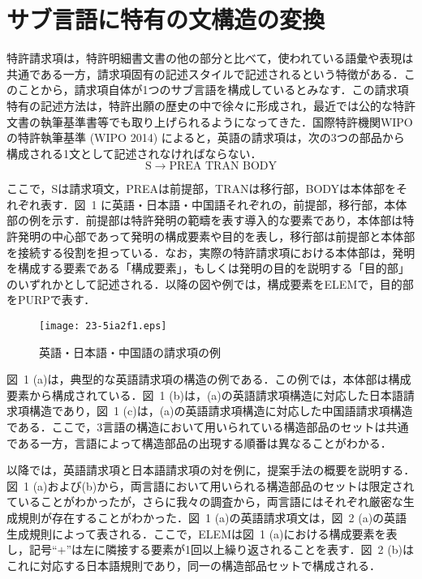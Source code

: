 \documentclass[japanese]{jnlp_1.4}
\begin{document}
\section{サブ言語に特有の文構造の変換}

特許請求項は，特許明細書文書の他の部分と比べて，使われている語彙や表現は共通である一方，請求項固有の記述スタイルで記述されるという特徴がある．このことから，請求項自体が1つのサブ言語を構成しているとみなす．この請求項特有の記述方法は，特許出願の歴史の中で徐々に形成され，最近では公的な特許文書の執筆基準書等でも取り上げられるようになってきた．国際特許機関WIPOの特許執筆基準 (WIPO 
2014) によると，英語の請求項は，次の3つの部品から構成される1文として記述されなければならない．
\[
\mathrm{S} \rightarrow \text{PREA\ TRAN\ BODY}
\]

ここで，Sは請求項文，PREAは前提部，TRANは移行部，BODYは本体部をそれぞれ表す．図~1 に英語・日本語・中国語それぞれの，前提部，移行部，本体部の例を示す．前提部は特許発明の範疇を表す導入的な要素であり，本体部は特許発明の中心部であって発明の構成要素や目的を表し，移行部は前提部と本体部を接続する役割を担っている．なお，実際の特許請求項における本体部は，発明を構成する要素である「構成要素」，もしくは発明の目的を説明する「目的部」のいずれかとして記述される．以降の図や例では，構成要素をELEMで，目的部をPURPで表す．

\begin{figure}[t]
\begin{center}
\texttt{[image: 23-5ia2f1.eps]}
\end{center}
\caption{英語・日本語・中国語の請求項の例}
\label{fig01}
\end{figure}

図~1 
(a)は，典型的な英語請求項の構造の例である．この例では，本体部は構成要素から構成されている．図~1 
(b)は，(a)の英語請求項構造に対応した日本語請求項構造であり，図~1 (c)は，(a)の英語請求項構造に対応した中国語請求項構造である．ここで，3言語の構造において用いられている構造部品のセットは共通である一方，言語によって構造部品の出現する順番は異なることがわかる．

以降では，英語請求項と日本語請求項の対を例に，提案手法の概要を説明する．図~1 (a)および(b)から，両言語において用いられる構造部品のセットは限定されていることがわかったが，さらに我々の調査から，両言語にはそれぞれ厳密な生成規則が存在することがわかった．図~1 (a)の英語請求項文は，図~2 (a)の英語生成規則によって表される．ここで，ELEMは図~1 (a)における構成要素を表し，記号``$+$''は左に隣接する要素が1回以上繰り返されることを表す．図~2 (b)はこれに対応する日本語規則であり，同一の構造部品セットで構成される．
\end{document}
